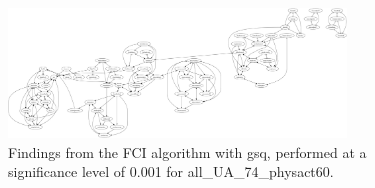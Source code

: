 \begin{figure}[htbp]
    \centering
    \includegraphics[width=0.8\textwidth]{Report/final_report/pictures/FCI_gsq_0.001_all_UA_74_physact60.png}
    \caption{Findings from the FCI algorithm with gsq, performed at a significance level of 0.001 for all_UA_74_physact60.}
    \label{fig:fci_gsq_0.001all_UA_74_physact60}
\end{figure}
